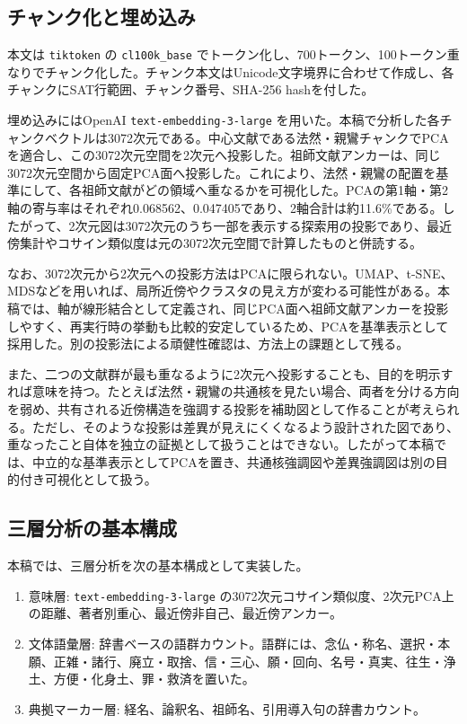 \documentclass[uplatex,dvipdfmx,11pt,a4paper]{jsarticle}
\begin{document}
\subsection{チャンク化と埋め込み}

本文は \texttt{tiktoken} の \texttt{cl100k\_base} でトークン化し、700トークン、100トークン重なりでチャンク化した\cite{tiktoken}。チャンク本文はUnicode文字境界に合わせて作成し、各チャンクにSAT行範囲、チャンク番号、SHA-256 hashを付した。

埋め込みにはOpenAI \texttt{text-embedding-3-large} を用いた\cite{openai-embeddings}。本稿で分析した各チャンクベクトルは3072次元である。中心文献である法然・親鸞チャンクでPCAを適合し、この3072次元空間を2次元へ投影した。祖師文献アンカーは、同じ3072次元空間から固定PCA面へ投影した。これにより、法然・親鸞の配置を基準にして、各祖師文献がどの領域へ重なるかを可視化した。PCAの第1軸・第2軸の寄与率はそれぞれ0.068562、0.047405であり、2軸合計は約11.6\%である。したがって、2次元図は3072次元のうち一部を表示する探索用の投影であり、最近傍集計やコサイン類似度は元の3072次元空間で計算したものと併読する。

なお、3072次元から2次元への投影方法はPCAに限られない。UMAP、t-SNE、MDSなどを用いれば、局所近傍やクラスタの見え方が変わる可能性がある。本稿では、軸が線形結合として定義され、同じPCA面へ祖師文献アンカーを投影しやすく、再実行時の挙動も比較的安定しているため、PCAを基準表示として採用した。別の投影法による頑健性確認は、方法上の課題として残る。

また、二つの文献群が最も重なるように2次元へ投影することも、目的を明示すれば意味を持つ。たとえば法然・親鸞の共通核を見たい場合、両者を分ける方向を弱め、共有される近傍構造を強調する投影を補助図として作ることが考えられる。ただし、そのような投影は差異が見えにくくなるよう設計された図であり、重なったこと自体を独立の証拠として扱うことはできない。したがって本稿では、中立的な基準表示としてPCAを置き、共通核強調図や差異強調図は別の目的付き可視化として扱う。

\subsection{三層分析の基本構成}

本稿では、三層分析を次の基本構成として実装した。

\begin{enumerate}
  \item 意味層: \texttt{text-embedding-3-large} の3072次元コサイン類似度、2次元PCA上の距離、著者別重心、最近傍非自己、最近傍アンカー。
  \item 文体語彙層: 辞書ベースの語群カウント。語群には、念仏・称名、選択・本願、正雑・諸行、廃立・取捨、信・三心、願・回向、名号・真実、往生・浄土、方便・化身土、罪・救済を置いた。
  \item 典拠マーカー層: 経名、論釈名、祖師名、引用導入句の辞書カウント。
\end{enumerate}
\end{document}
